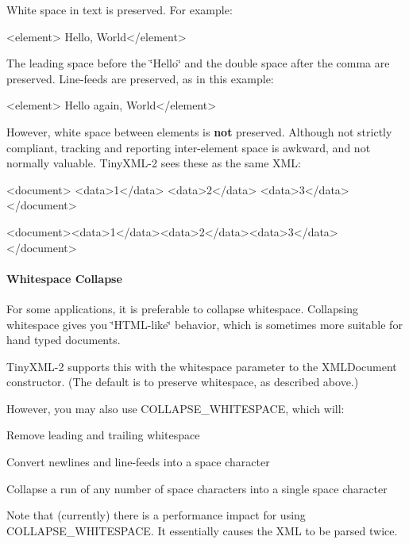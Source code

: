 White space in text is preserved. For example\+: \begin{DoxyVerb}<element> Hello,  World</element>
\end{DoxyVerb}


The leading space before the \char`\"{}\+Hello\char`\"{} and the double space after the comma are preserved. Line-\/feeds are preserved, as in this example\+: \begin{DoxyVerb}<element> Hello again,  
          World</element>
\end{DoxyVerb}


However, white space between elements is {\bfseries not} preserved. Although not strictly compliant, tracking and reporting inter-\/element space is awkward, and not normally valuable. Tiny\+X\+M\+L-\/2 sees these as the same X\+ML\+: \begin{DoxyVerb}<document>
    <data>1</data>
    <data>2</data>
    <data>3</data>
</document>

<document><data>1</data><data>2</data><data>3</data></document>
\end{DoxyVerb}


\paragraph*{Whitespace Collapse}

For some applications, it is preferable to collapse whitespace. Collapsing whitespace gives you \char`\"{}\+H\+T\+M\+L-\/like\char`\"{} behavior, which is sometimes more suitable for hand typed documents.

Tiny\+X\+M\+L-\/2 supports this with the \textquotesingle{}whitespace\textquotesingle{} parameter to the X\+M\+L\+Document constructor. (The default is to preserve whitespace, as described above.)

However, you may also use C\+O\+L\+L\+A\+P\+S\+E\+\_\+\+W\+H\+I\+T\+E\+S\+P\+A\+CE, which will\+:


\begin{DoxyItemize}
\item Remove leading and trailing whitespace
\item Convert newlines and line-\/feeds into a space character
\item Collapse a run of any number of space characters into a single space character
\end{DoxyItemize}

Note that (currently) there is a performance impact for using C\+O\+L\+L\+A\+P\+S\+E\+\_\+\+W\+H\+I\+T\+E\+S\+P\+A\+CE. It essentially causes the X\+ML to be parsed twice.

